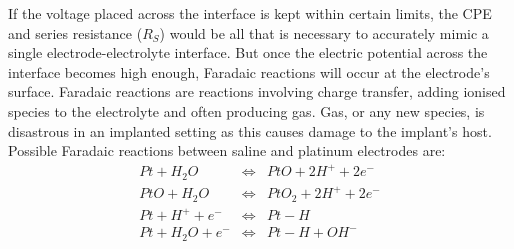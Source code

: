     If the voltage placed across the interface is kept within certain limits, the CPE and series resistance ($R_{S}$) would be all that is necessary to accurately mimic a single electrode-electrolyte interface.
    But once the electric potential across the interface becomes high enough, Faradaic reactions will occur at the electrode's surface.
    Faradaic reactions are reactions involving charge transfer, adding ionised species to the electrolyte and often producing gas.
    Gas, or any new species, is disastrous in an implanted setting as this causes damage to the implant's host.
    Possible Faradaic reactions between saline and platinum electrodes are:
    \begin{eqnarray}
        Pt + H_{2}O &\Leftrightarrow& PtO + 2 H^{+} + 2 e^{-}\\
        PtO + H_{2}O &\Leftrightarrow& PtO_{2} + 2 H^{+} + 2e^{-}\\
        Pt + H^{+} + e^{-} & \Leftrightarrow & Pt-H\\
        Pt + H_{2}O + e^{-} &\Leftrightarrow& Pt-H+OH^{-}
    \end{eqnarray}

